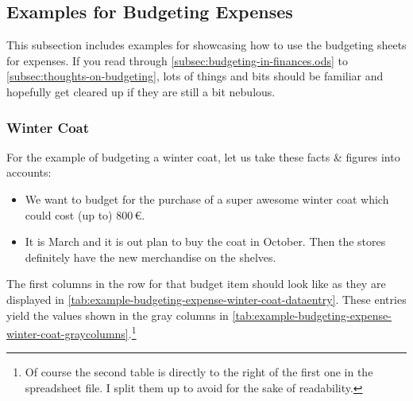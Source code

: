 \subsection{Examples for Budgeting Expenses}
\label{subsec:examples-budgeting-expenses}

This subsection includes examples for showcasing how to use the budgeting sheets for expenses.
If you read through \autoref{subsec:budgeting-in-finances.ods} to \autoref{subsec:thoughts-on-budgeting}, lots of things and bits should be familiar and hopefully get cleared up if they are still a bit nebulous.

\subsubsection{Winter Coat}
\label{subsubsec:example-budgeting-expense-winter-coat}

For the example of budgeting a winter coat, let us take these facts \& figures into accounts:
\begin{itemize}
	\item We want to budget for the purchase of a super awesome winter coat which could cost (up to) 800\,€.
	\item It is March and it is out plan to buy the coat in October.
	Then the stores definitely have the new merchandise on the shelves.
\end{itemize}
The first columns in the row for that budget item should look like as they are displayed in \autoref{tab:example-budgeting-expense-winter-coat-dataentry}.
These entries yield the values shown in the gray columns in \autoref{tab:example-budgeting-expense-winter-coat-graycolumns}.\footnote{Of course the second table is directly to the right of the first one in the spreadsheet file.
I split them up to avoid for the sake of readability.}

